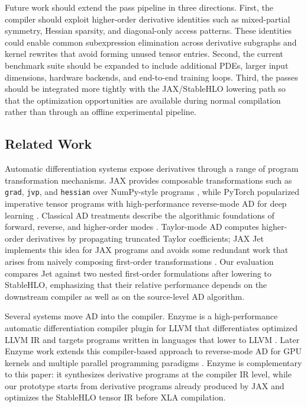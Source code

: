 \documentclass{article}
\theoremstyle{plain}
\theoremstyle{definition}
\theoremstyle{remark}
\begin{document}
Future work should extend the pass pipeline in three directions.  First, the
compiler should exploit higher-order derivative identities such as mixed-partial
symmetry, Hessian sparsity, and diagonal-only access patterns.  These identities
could enable common subexpression elimination across derivative subgraphs and
kernel rewrites that avoid forming unused tensor entries.  Second, the current
benchmark suite should be expanded to include additional PDEs, larger input
dimensions, hardware backends, and end-to-end training loops.  Third, the passes
should be integrated more tightly with the JAX/StableHLO lowering path so that
the optimization opportunities are available during normal compilation rather
than through an offline experimental pipeline.

\subsection{Related Work}
Automatic differentiation systems expose derivatives through a range of program
transformation mechanisms.  JAX provides composable transformations such as
\texttt{grad}, \texttt{jvp}, and \texttt{hessian} over NumPy-style programs
\cite{bradbury2018jax}, while PyTorch popularized imperative tensor programs
with high-performance reverse-mode AD for deep learning
\cite{paszke2019pytorch}.  Classical AD treatments describe the algorithmic
foundations of forward, reverse, and higher-order modes
\cite{griewank2008evaluating}.  Taylor-mode AD computes higher-order
derivatives by propagating truncated Taylor coefficients; JAX Jet implements
this idea for JAX programs and avoids some redundant work that arises from
naively composing first-order transformations \cite{bettencourt2019taylor}.
Our evaluation compares Jet against two nested first-order formulations after
lowering to StableHLO, emphasizing that their relative performance depends on
the downstream compiler as well as on the source-level AD algorithm.

Several systems move AD into the compiler.  Enzyme is a high-performance
automatic differentiation compiler plugin for LLVM that differentiates optimized
LLVM IR and targets programs written in languages that lower to LLVM
\cite{moses2020enzyme}.  Later Enzyme work extends this compiler-based approach
to reverse-mode AD for GPU kernels and multiple parallel programming paradigms
\cite{moses2021reverse,moses2022scalable}.  Enzyme is complementary to this
paper: it synthesizes derivative programs at the compiler IR level, while our
prototype starts from derivative programs already produced by JAX and optimizes
the StableHLO tensor IR before XLA compilation.
\end{document}
